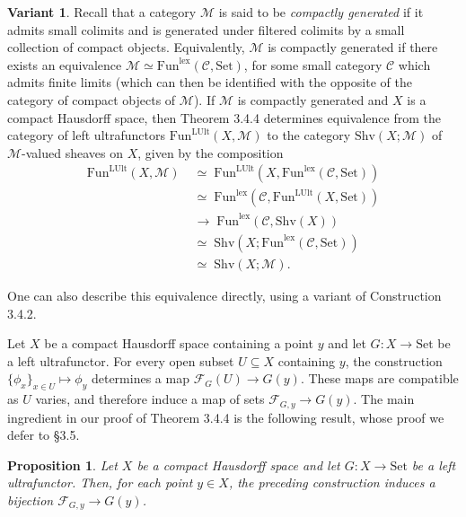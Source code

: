 \documentclass[11pt]{article}
\theoremstyle{plain}
\newtheorem{proposition}{Proposition}
\theoremstyle{definition}
\newtheorem{variant}{Variant}
\begin{document}
\renewcommand{\thevariant}{3.4.5}
\begin{variant}
Recall that a category $\mathcal{M}$ is said to be \emph{compactly generated} if it admits small colimits and is generated under filtered colimits by a small collection of compact objects. Equivalently, $\mathcal{M}$ is compactly generated if there exists an equivalence $\mathcal{M} \simeq \mathrm{Fun}^{\mathrm{lex}}(\mathcal{C},\mathrm{Set})$, for some small category $\mathcal{C}$ which admits finite limits (which can then be identified with the opposite of the category of compact objects of $\mathcal{M}$). If $\mathcal{M}$ is compactly generated and $X$ is a compact Hausdorff space, then Theorem 3.4.4 determines equivalence from the category of left ultrafunctors $\mathrm{Fun}^{\mathrm{LUlt}}(X,\mathcal{M})$ to the category $\mathrm{Shv}(X;\mathcal{M})$ of $\mathcal{M}$-valued sheaves on $X$, given by the composition
\begin{align*}
\mathrm{Fun}^{\mathrm{LUlt}}(X,\mathcal{M}) \;&\simeq\; \mathrm{Fun}^{\mathrm{LUlt}}(X,\mathrm{Fun}^{\mathrm{lex}}(\mathcal{C},\mathrm{Set}))\\
&\simeq\; \mathrm{Fun}^{\mathrm{lex}}(\mathcal{C},\mathrm{Fun}^{\mathrm{LUlt}}(X,\mathrm{Set}))\\
&\to\; \mathrm{Fun}^{\mathrm{lex}}(\mathcal{C},\mathrm{Shv}(X))\\
&\simeq\; \mathrm{Shv}(X;\mathrm{Fun}^{\mathrm{lex}}(\mathcal{C},\mathrm{Set}))\\
&\simeq\; \mathrm{Shv}(X;\mathcal{M}).
\end{align*}
\end{variant}

One can also describe this equivalence directly, using a variant of Construction 3.4.2.

Let $X$ be a compact Hausdorff space containing a point $y$ and let $G : X \to \mathrm{Set}$ be a left ultrafunctor. For every open subset $U \subseteq X$ containing $y$, the construction $\{\phi_x\}_{x \in U} \mapsto \phi_y$ determines a map $\mathscr{F}_G(U) \to G(y)$. These maps are compatible as $U$ varies, and therefore induce a map of sets $\mathscr{F}_{G,y} \to G(y)$. The main ingredient in our proof of Theorem 3.4.4 is the following result, whose proof we defer to §3.5.

\renewcommand{\theproposition}{3.4.6}
\begin{proposition}
Let $X$ be a compact Hausdorff space and let $G : X \to \mathrm{Set}$ be a left ultrafunctor. Then, for each point $y \in X$, the preceding construction induces a bijection $\mathscr{F}_{G,y} \to G(y)$.
\end{proposition}
\end{document}
